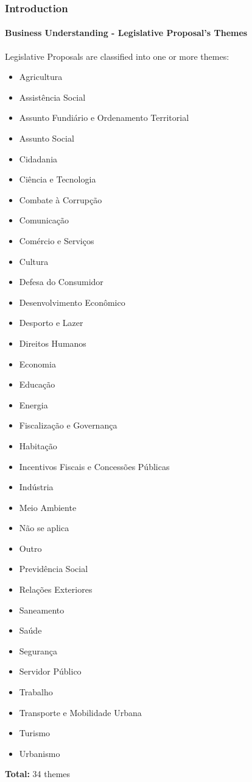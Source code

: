 \begin{frame}
	\frametitle{Introduction}
	\framesubtitle{Business Understanding - Legislative Proposal's Themes}

	\begin{exampleblock}{Legislative Proposals are classified into one or more themes:} 
		\begin{multicols}{3}
			\begin{itemize}
				\scriptsize
				\item Agricultura
				\item Assistência Social
				\item Assunto Fundiário e Ordenamento Territorial
				\item Assunto Social
				\item Cidadania
				\item Ciência e Tecnologia
				\item Combate à Corrupção
				\item Comunicação
				\item Comércio e Serviços
				\item Cultura
				\item Defesa do Consumidor
				\item Desenvolvimento Econômico
				\item Desporto e Lazer
				\item Direitos Humanos
				\item Economia
				\item Educação
				\item Energia
				\item Fiscalização e Governança
				\item Habitação
				\item Incentivos Fiscais e Concessões Públicas
				\item Indústria
				\item Meio Ambiente
				\item Não se aplica
				\item Outro
				\item Previdência Social
				\item Relações Exteriores
				\item Saneamento
				\item Saúde
				\item Segurança
				\item Servidor Público
				\item Trabalho
				\item Transporte e Mobilidade Urbana
				\item Turismo
				\item Urbanismo
				\normalsize
			\end{itemize}
		\end{multicols}
		\textbf{Total:} 34 themes	
	\end{exampleblock}
\end{frame}
